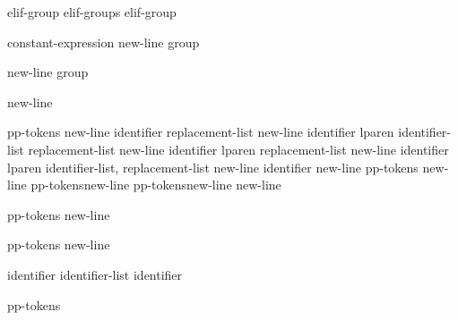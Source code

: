 \begin{bnf}
\br
    elif-group\br
    elif-groups elif-group
\end{bnf}

\begin{bnftab}
\br
\>\>\>constant-expression new-line group\opt
\end{bnftab}

\begin{bnftab}
\br
\>\>\>new-line group\opt
\end{bnftab}

\begin{bnftab}
\br
\>\>\>new-line
\end{bnftab}

\begin{bnftab}
\br
\>\>\>pp-tokens new-line\br
\>\>\>identifier replacement-list new-line\br
\>\>\>identifier lparen identifier-list\opt \terminal{)} replacement-list new-line\br
\>\>\>identifier lparen  replacement-list new-line\br
\>\>\>identifier lparen identifier-list,  replacement-list new-line\br
\>\>\>identifier new-line\br
\>\>\>pp-tokens new-line\br
\>\>\>pp-tokens\opt new-line\br
\>\>\>pp-tokens\opt new-line\br
\>\terminal{\# }new-line
\end{bnftab}

\begin{bnf}
\br
    pp-tokens\opt{} new-line
\end{bnf}

\begin{bnf}
\br
    pp-tokens new-line
\end{bnf}

\begin{bnf}
\br
\end{bnf}

\begin{bnf}
\br
    identifier\br
    identifier-list \terminal{,} identifier
\end{bnf}

\begin{bnf}
\br
    pp-tokens\opt
\end{bnf}

